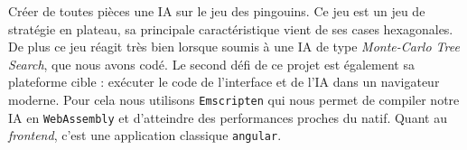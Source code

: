 Créer de toutes pièces une IA sur le jeu des pingouins. Ce jeu est un
jeu de stratégie en plateau, sa principale caractéristique vient de ses
cases hexagonales. De plus ce jeu réagit très bien lorsque soumis à une
IA de type \emph{Monte-Carlo Tree Search}, que nous avons codé. Le
second défi de ce projet est également sa plateforme cible : exécuter le
code de l'interface et de l'IA dans un navigateur moderne. Pour cela
nous utilisons \texttt{Emscripten} qui nous permet de compiler notre IA
en \texttt{WebAssembly} et d'atteindre des performances proches du
natif. Quant au \emph{frontend}, c'est une application classique
\texttt{angular}.
